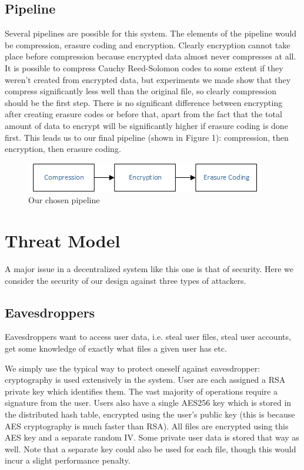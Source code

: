 \documentclass[11pt]{IEEEtran}
\begin{document}
\subsection{Pipeline}

Several pipelines are possible for this system. The elements of the pipeline would be compression, erasure coding and encryption. Clearly encryption cannot take place before compression because encrypted data almost never compresses at all. It is possible to compress Cauchy Reed-Solomon codes to some extent if they weren't created from encrypted data, but experiments we made show that they compress significantly less well than the original file, so clearly compression should be the first step. There is no significant difference between encrypting after creating erasure codes or before that, apart from the fact that the total amount of data to encrypt will be significantly higher if erasure coding is done first. This leads us to our final pipeline (shown in Figure 1): compression, then encryption, then erasure coding.

\begin{figure}
\centering
\includegraphics[scale=0.8]{flow1.png}
\caption{Our chosen pipeline}
\end{figure}

\section{Threat Model}

A major issue in a decentralized system like this one is that of security. Here we consider the security of our design against three types of attackers.

\subsection{Eavesdroppers}

Eavesdroppers want to access user data, i.e. steal user files, steal user accounts, get some knowledge of exactly what files a given user has etc.

We simply use the typical way to protect oneself against eavesdropper: cryptography is used extensively in the system. User are each assigned a RSA private key which identifies them. The vast majority of operations require a signature from the user. Users also have a single AES256 key which is stored in the distributed hash table, encrypted using the user's public key (this is because AES cryptography is much faster than RSA). All files are encrypted using this AES key and a separate random IV. Some private user data is stored that way as well. Note that a separate key could also be used for each file, though this would incur a slight performance penalty.
\end{document}
